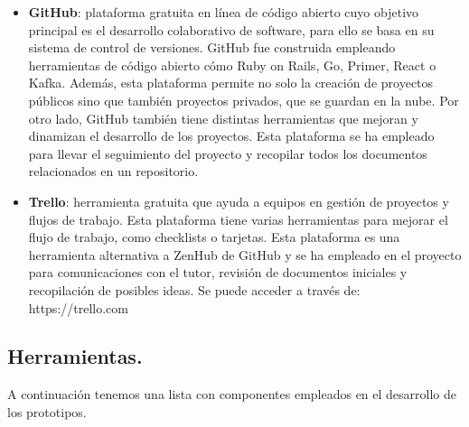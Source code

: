 \begin{itemize}
\item \textbf{GitHub}\cite{GitHub}: plataforma gratuita en línea de código abierto cuyo objetivo principal es el desarrollo colaborativo de software, para ello se basa en su sistema de control de versiones. GitHub fue construida empleando herramientas de código abierto cómo  Ruby on Rails, Go, Primer, React o Kafka. Además, esta plataforma permite no solo la creación de proyectos públicos sino que también proyectos privados, que se guardan en la nube. Por otro lado, GitHub también tiene distintas herramientas que mejoran y dinamizan el desarrollo de los proyectos. Esta plataforma se ha empleado para llevar el seguimiento del proyecto y recopilar todos los documentos relacionados en un repositorio.

\item \textbf{Trello}\cite{Trello}: herramienta gratuita que ayuda a equipos en gestión de proyectos y flujos de trabajo. Esta plataforma tiene varias herramientas para mejorar el flujo de trabajo, como checklists o tarjetas. Esta plataforma es una herramienta alternativa a ZenHub de GitHub y se ha empleado en el proyecto para comunicaciones con el tutor, revisión de documentos iniciales y recopilación de posibles ideas. Se puede acceder a través de: https://trello.com

\end{itemize}

\subsection{Herramientas.}
A continuación tenemos una lista con componentes empleados en el desarrollo de los prototipos.


